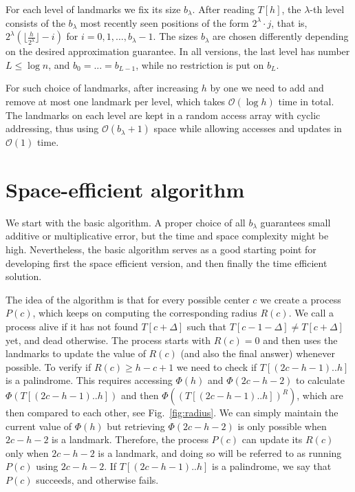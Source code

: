 \documentclass{article}[11pt,letter]
\newcommand{\bigo}{\mathcal{O}}
\newcommand{\head}{h}
\newcommand{\hash}{\Phi}
\newcommand{\bhash}{\hash}
\newcommand{\level}{\lambda}
\begin{document}
For each level of landmarks we fix its size $b_{\level}$. After reading $T[\head]$, the
$\level$-th level consists of the $b_\level$ most recently seen positions of the form $2^\level \cdot j$,
that is, $2^\level (\lfloor \frac{\head}{2^\level} \rfloor - i)$ for $i = 0, 1, \ldots, b_\level-1$.
The sizes $b_\level$ are chosen differently depending on the desired approximation guarantee.
In all versions, the last level has number $L\le \log n$, and $b_0=...=b_{L-1}$, while no restriction is put on $b_L$.


For such choice of landmarks, after increasing $h$ by one we need to add and remove at
most one landmark per level, which takes $\bigo(\log h)$ time in total. The landmarks
on each level are kept in a random access array with cyclic addressing, thus using 
$\bigo(b_{\level}+1)$ space while allowing accesses and updates in $\bigo(1)$ time.

\section{Space-efficient algorithm}
\label{section:basic}
We start with the basic algorithm. A proper choice of all $b_{\level}$ guarantees small additive or multiplicative error, but the time and
space complexity might be high. Nevertheless, the basic algorithm serves as a good starting point for developing first the space efficient version,
and then finally the time efficient solution.

The idea of the algorithm is that for every possible center $c$ we create a process $P(c)$, which keeps on computing the corresponding
radius $R(c)$. We call a process alive if it has not found $T[c+\Delta]$ such that
$T[c-1-\Delta]\neq T[c+\Delta]$ yet, and dead otherwise. The process starts with $R(c)=0$ and then uses the landmarks to update the value
of $R(c)$ (and also the final answer) whenever possible.
To verify if $R(c) \geq \head-c+1$ we need to check if $T[(2c-\head-1)..h]$ is a palindrome. This requires accessing
$\bhash(\head)$ and $\bhash(2c-\head-2)$ to calculate $\hash(T[(2c-\head-1)..\head])$ and then $\hash((T[(2c-\head-1)..\head])^{R})$, which
are then compared to each other, see Fig.~\ref{fig:radius}.
We can simply maintain the current value of $\bhash(\head)$ but retrieving $\bhash(2c-\head-2)$ is only possible when $2c-\head-2$ is a landmark.
Therefore, the process $P(c)$ can update its $R(c)$ only when $2c-\head-2$ is a landmark, and doing so will be referred to as running $P(c)$ using $2c-\head-2$. If $T[(2c-\head-1)..\head]$
is a palindrome, we say that $P(c)$ succeeds, and otherwise fails.
\end{document}

